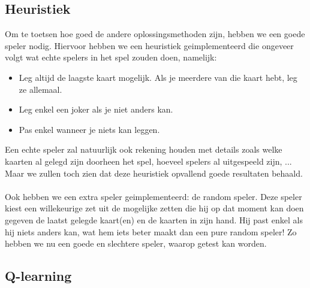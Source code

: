 \documentclass[11pt]{article}
\begin{document}
\subsection{Heuristiek}

Om te toetsen hoe goed de andere oplossingsmethoden zijn, hebben we een goede speler nodig. Hiervoor hebben we een heuristiek geimplementeerd die ongeveer volgt wat echte spelers in het spel zouden doen, namelijk:
\begin{itemize}
	\item Leg altijd de laagste kaart mogelijk. Als je meerdere van die kaart hebt, leg ze allemaal.
	\item Leg enkel een joker als je niet anders kan.
	\item Pas enkel wanneer je niets kan leggen.
\end{itemize}
Een echte speler zal natuurlijk ook rekening houden met details zoals welke kaarten al gelegd zijn doorheen het spel, hoeveel spelers al uitgespeeld zijn, ... Maar we zullen toch zien dat deze heuristiek opvallend goede resultaten behaald. \\\\
Ook hebben we een extra speler geimplementeerd: de random speler. Deze speler kiest een willekeurige zet uit de mogelijke zetten die hij op dat moment kan doen gegeven de laatst gelegde kaart(en) en de kaarten in zijn hand. Hij past enkel als hij niets anders kan, wat hem iets beter maakt dan een pure random speler! Zo hebben we nu een goede en slechtere speler, waarop getest kan worden.\\

\subsection{Q-learning}
\end{document}
